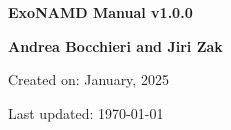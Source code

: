 

\begin{titlepage}

    \centering

    \vspace*{30mm} %
    \textbf{\Huge {ExoNAMD Manual v1.0.0}}


    \vspace{25mm}
    \Large \textbf{{Andrea Bocchieri and Jiri Zak}}

    \vspace*{8mm}
    \small Created on: January, 2025 

    \vspace{2mm}
    \small Last updated: \MonthYearFormat\today


\end{titlepage}

\clearpage
{}
\tableofcontents
\listoffigures
\listoftables
\clearpage
{}